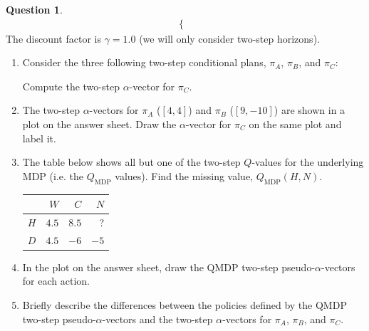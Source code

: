 \documentclass{article}
\theoremstyle{definition}
\newtheorem{question}[thm]{Question}
\begin{document}
\begin{question}
\begin{align*}
\begin{cases}
    \end{cases}
\end{align*}
The discount factor is \underline{$\gamma = 1.0$} (we will only consider two-step horizons).
\begin{enumerate}[label=\alph*)]
    \item Consider the three following two-step conditional plans, $\pi_A$, $\pi_B$, and $\pi_C$:
    \begin{center}
    \end{center}
    Compute the two-step $\alpha$-vector for $\pi_C$.
    \item The two-step $\alpha$-vectors for $\pi_A$ ($[4, 4]$) and $\pi_B$ ($[9,-10]$) are shown in a plot on the answer sheet. Draw the $\alpha$-vector for $\pi_C$ on the same plot and label it.
    \item The table below shows all but one of the two-step $Q$-values for the underlying MDP (i.e. the $Q_\text{MDP}$ values). Find the missing value, $Q_\text{MDP}(H, N)$.
        \begin{center}
            \begin{tabular}{c|rrr}
                 & $W$ & $C$ & $N$ \\
                \hline
                $H$ & $4.5$ & $8.5$ & ? \\
                $D$ & $4.5$ & $-6$ & $-5$
            \end{tabular}
        \end{center}
    \item In the plot on the answer sheet, draw the QMDP two-step pseudo-$\alpha$-vectors for each action.
    \item Briefly describe the differences between the policies defined by the QMDP two-step pseudo-$\alpha$-vectors and the two-step $\alpha$-vectors for $\pi_A$, $\pi_B$, and $\pi_C$.
\end{enumerate}

\end{question}
\end{document}
